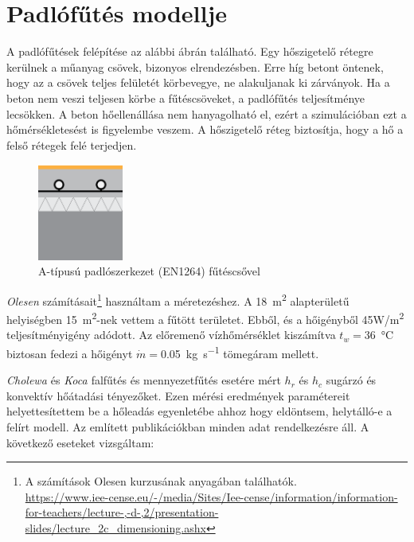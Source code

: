 \section{Padlófűtés modellje}

A padlófűtések felépítése az alábbi ábrán található. Egy hőszigetelő rétegre kerülnek a műanyag csövek, bizonyos elrendezésben. Erre híg betont öntenek, hogy az a csövek teljes felületét körbevegye, ne alakuljanak ki zárványok. Ha a beton nem veszi teljesen körbe a fűtéscsöveket, a padlófűtés teljesítménye lecsökken. A beton hőellenállása nem hanyagolható el, ezért a szimulációban ezt a hőmérsékletesést is figyelembe veszem. A hőszigetelő réteg biztosítja, hogy a hő a felső rétegek felé terjedjen.

\begin{figure}[H]
	\centering
	\includegraphics[trim=0 70 0 0, clip,width=0.25\textwidth]{figures/ISO11855typeA}
	\caption{A-típusú padlószerkezet (EN1264) fűtéscsővel}
	\label{fig:futotest-padlofutes}
\end{figure}

\textit{Olesen} számításait\footnote{A számítások Olesen kurzusának anyagában találhatók. \\
	\url{https://www.iee-cense.eu/-/media/Sites/Iee-cense/information/information-for-teachers/lecture-,-d-,2/presentation-slides/lecture_2c_dimensioning.ashx}} használtam a méretezéshez.
A \SI{18}{\metre\squared} alapterületű helyiségben \SI{15}{\metre\squared}-nek vettem a fűtött területet. Ebből, és a hőigényből 45\si[per-mode=symbol]{\watt\per\metre\squared} teljesítményigény adódott.
Az előremenő vízhőmérséklet kiszámítva $t_w =$\SI{36}{\celsius} biztosan fedezi a hőigényt $\dot{m}=$\SI{0.05}{\kilogram\per\second} tömegáram mellett.

\textit{Cholewa \cite{CHOLEWA2013599}} és \textit{Koca \cite{Koca}} falfűtés és mennyezetfűtés esetére mért $h_r$ és $h_c$ sugárzó és konvektív hőátadási tényezőket. Ezen mérési eredmények paramétereit helyettesítettem be a hőleadás egyenletébe ahhoz hogy eldöntsem, helytálló-e a felírt modell. Az említett publikációkban minden adat rendelkezésre áll. A következő eseteket vizsgáltam:

